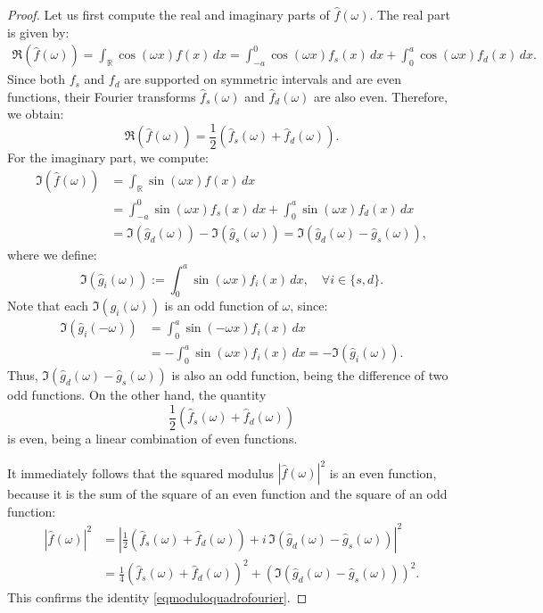 \documentclass[preprint,hidelinks,authoryear]{elsarticle}
\theoremstyle{plain}
\theoremstyle{definition}
\theoremstyle{remark}
\begin{document}
\begin{proof}
Let us first compute the real and imaginary parts of $ \hat{f}(\omega) $. The real part is given by:
\begin{align*}
    \Re(\hat{f}(\omega)) = \int_{\mathbb{R}} \cos(\omega x) f(x) \, dx = \int_{-a}^{0} \cos(\omega x) f_s(x) \, dx + \int_{0}^{a} \cos(\omega x) f_d(x) \, dx.
\end{align*}
 Since both $ f_s $ and $ f_d $ are supported on symmetric intervals and are even functions, their Fourier transforms $ \hat{f}_s(\omega) $ and $ \hat{f}_d(\omega) $ are also even. Therefore, we obtain:
\begin{equation}
    \Re(\hat{f}(\omega)) = \frac{1}{2}\left( \hat{f}_s(\omega) + \hat{f}_d(\omega)\right).
\end{equation}
For the imaginary part, we compute:
\begin{equation}
\begin{split}
    \Im(\hat{f}(\omega)) &= \int_{\mathbb{R}} \sin(\omega x) f(x) \, dx \\
    &=  \int_{-a}^{0} \sin(\omega x) f_s(x) \, dx +\int_{0}^{a} \sin(\omega x) f_d(x) \, dx \\
    &= \Im(\hat{g}_d(\omega)) - \Im(\hat{g}_s(\omega)) = \Im(\hat{g}_d(\omega) - \hat{g}_s(\omega)),
\end{split}
\end{equation}
where we define:
$$
\Im(\hat{g}_i(\omega)) := \int_0^a \sin(\omega x) f_i(x) \, dx, \quad \forall i \in \{s, d\}.
$$
Note that each $ \Im(\hat{g}_i(\omega)) $ is an odd function of $ \omega $, since:
\begin{align*}
\Im(\hat{g}_i(-\omega)) &= \int_0^a \sin(-\omega x) f_i(x) \, dx \\
                        &= - \int_0^a \sin(\omega x) f_i(x) \, dx = -\Im(\hat{g}_i(\omega)).
\end{align*}
Thus, $ \Im(\hat{g}_d(\omega) - \hat{g}_s(\omega)) $ is also an odd function, being the difference of two odd functions.  
On the other hand, the quantity
$$
\frac{1}{2} \left(  \hat{f}_s(\omega) + \hat{f}_d(\omega) \right)
$$
is even, being a linear combination of even functions.

It immediately follows that the squared modulus $ |\hat{f}(\omega)|^2 $ is an even function, because it is the sum of the square of an even function and the square of an odd function:
\begin{equation}
\begin{split}
|\hat{f}(\omega)|^2 &= \left| \frac{1}{2} \left( \hat{f}_s(\omega) + \hat{f}_d(\omega) \right) + i \, \Im(\hat{g}_d(\omega) - \hat{g}_s(\omega)) \right|^2 \\
&= \frac{1}{4} \left(  \hat{f}_s(\omega) +  \hat{f}_d(\omega) \right)^2 + \left( \Im(\hat{g}_d(\omega) - \hat{g}_s(\omega)) \right)^2.
\end{split}
\end{equation}
This confirms the identity \eqref{eqmoduloquadrofourier}.  
\end{proof}
\end{document}

